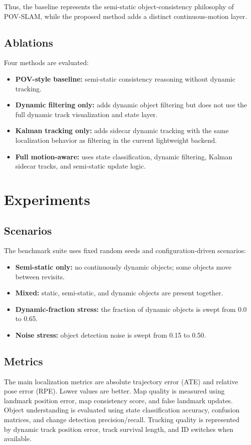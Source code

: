 ﻿\documentclass[11pt]{article}
\begin{document}
Thus, the baseline represents the semi-static object-consistency philosophy of POV-SLAM, while the proposed method adds a distinct continuous-motion layer.

\subsection{Ablations}
Four methods are evaluated:
\begin{itemize}[leftmargin=*]
    \item \textbf{POV-style baseline:} semi-static consistency reasoning without dynamic tracking.
    \item \textbf{Dynamic filtering only:} adds dynamic object filtering but does not use the full dynamic track visualization and state layer.
    \item \textbf{Kalman tracking only:} adds sidecar dynamic tracking with the same localization behavior as filtering in the current lightweight backend.
    \item \textbf{Full motion-aware:} uses state classification, dynamic filtering, Kalman sidecar tracks, and semi-static update logic.
\end{itemize}

\section{Experiments}
\subsection{Scenarios}
The benchmark suite uses fixed random seeds and configuration-driven scenarios:
\begin{itemize}[leftmargin=*]
    \item \textbf{Semi-static only:} no continuously dynamic objects; some objects move between revisits.
    \item \textbf{Mixed:} static, semi-static, and dynamic objects are present together.
    \item \textbf{Dynamic-fraction stress:} the fraction of dynamic objects is swept from 0.0 to 0.65.
    \item \textbf{Noise stress:} object detection noise is swept from 0.15 to 0.50.
\end{itemize}

\subsection{Metrics}
The main localization metrics are absolute trajectory error (ATE) and relative pose error (RPE). Lower values are better. Map quality is measured using landmark position error, map consistency score, and false landmark updates. Object understanding is evaluated using state classification accuracy, confusion matrices, and change detection precision/recall. Tracking quality is represented by dynamic track position error, track survival length, and ID switches when available.
\end{document}
